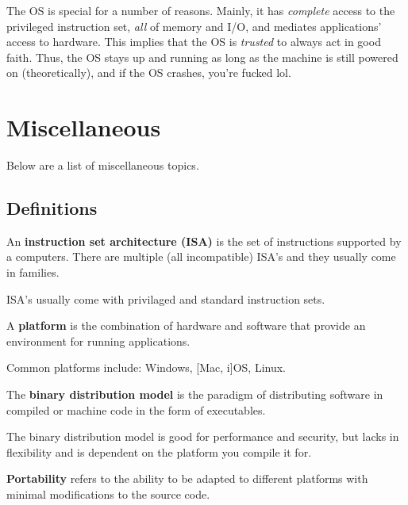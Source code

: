 \documentclass{report}
\begin{document}
The OS is special for a number of reasons. Mainly, it has \textit{complete} access to the privileged
instruction set, \textit{all} of memory and I/O, and mediates applications' access to
hardware. This implies that the OS is \textit{trusted} to always act in good faith. Thus, the OS
stays up and running as long as the machine is still powered on (theoretically), and if the OS crashes,
you're fucked lol.





\section{Miscellaneous}
Below are a list of miscellaneous topics.


\subsection{Definitions}
\begin{tcolorbox}[title=Definition: Instruction Set Architectures]
  An \textbf{instruction set architecture (ISA)} is the set of instructions supported by a
  computers. There are multiple (all incompatible) ISA's and they usually come in families.
\end{tcolorbox}

ISA's usually come with privilaged and standard instruction sets.

\begin{tcolorbox}[title=Definition: Platform]
  A \textbf{platform} is the combination of hardware and software that provide an environment for
  running applications.
\end{tcolorbox}

Common platforms include: Windows, [Mac, i]OS, Linux.

\begin{tcolorbox}[title=Definition: Binary Distribution Model]
  The \textbf{binary distribution model} is the paradigm of distributing software in compiled or
  machine code in the form of executables.
\end{tcolorbox}

The binary distribution model is good for performance and security, but lacks in flexibility and is
dependent on the platform you compile it for.

\begin{tcolorbox}[title=Definition: Portability]
  \textbf{Portability} refers to the ability to be adapted to different platforms with minimal
  modifications to the source code.
\end{tcolorbox}
\end{document}
